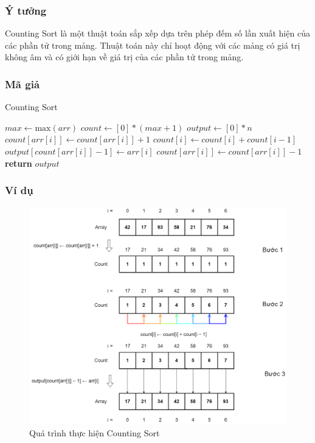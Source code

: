 \subsubsection{Ý tưởng}

Counting Sort là một thuật toán sắp xếp dựa trên phép đếm số lần xuất hiện của các phần tử trong mảng. Thuật toán này chỉ hoạt động với các mảng có giá trị không âm và có giới hạn về giá trị của các phần tử trong mảng.

\subsubsection{Mã giả}

\begin{algorithm}[H]
\caption{Counting Sort}
\begin{algorithmic}[1]
    \State $max \gets \text{max}(arr)$
    \State $count \gets [0] * (max + 1)$
    \State $output \gets [0] * n$
        \State $count[arr[i]] \gets count[arr[i]] + 1$
    \EndFor
        \State $count[i] \gets count[i] + count[i - 1]$
    \EndFor
        \State $output[count[arr[i]] - 1] \gets arr[i]$
        \State $count[arr[i]] \gets count[arr[i]] - 1$
    \EndFor
    \State \textbf{return} $output$
\EndFunction
\end{algorithmic}
\end{algorithm}

\subsubsection{Ví dụ}

\begin{figure}[H]
    \centering
    \includegraphics[width=0.75\linewidth]{img/counting_sort/1.png}
    \caption{Quá trình thực hiện Counting Sort}
\end{figure}

